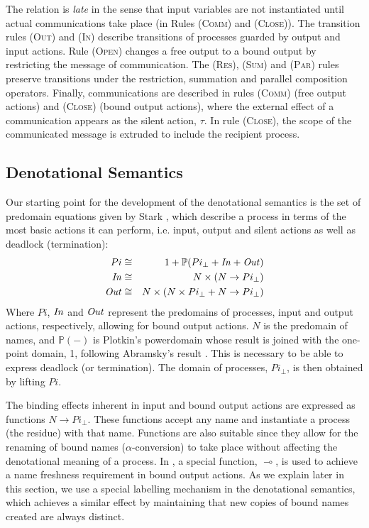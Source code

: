 \documentclass[10pt,a4paper,final,oneside,fleqn]{book}
\begin{document}
The relation is {\itshape late\/} in the sense that input variables are not instantiated until actual communications take place (in Rules (\textsc{Comm}) and (\textsc{Close})).  The transition rules (\textsc{Out}) and (\textsc{In}) describe transitions of processes guarded by output and input actions.  Rule (\textsc{Open}) changes a free output to a bound output by restricting the message of communication.  The (\textsc{Res}), (\textsc{Sum}) and (\textsc{Par}) rules preserve transitions under the restriction, summation and parallel composition operators.  Finally, communications are described in rules (\textsc{Comm}) (free output actions) and (\textsc{Close}) (bound output actions), where the external effect of a communication appears as the silent action, $\tau$. In rule (\textsc{Close}), the scope of the communicated message is extruded to include the recipient process.
\subsection{Denotational Semantics\label{sect:denpi}}
Our starting point for the development of the denotational semantics is the set of predomain equations given by Stark \cite{stark1}, which describe a process in terms of the most basic actions it can perform, i.e. input, output and silent actions as well as deadlock (termination):
\begin{eqnarray}
Pi&\cong&1+\mathbb{P}(Pi_\bot+\mbox{{\itshape In\/}}+\mbox{{\itshape Out\/}})\label{pre1}\\
\mbox{{\itshape In\/}}&\cong&N\times(N\to Pi_\bot)\label{pre2}\\
\mbox{{\itshape Out\/}}&\cong&N\times(N\times Pi_\bot+N\to Pi_\bot) \label{pre3}
\end{eqnarray}
Where $Pi$, $\mbox{{\itshape In\/}}$ and $\mbox{{\itshape Out\/}}$ represent the predomains of processes, input and output actions, respectively, allowing for bound output actions.  $N$ is the predomain of names, and $\mathbb{P}(-)$ is Plotkin's powerdomain whose result is joined with the one-point domain, 1, following Abramsky's result \cite[Def. 3.4]{abramsky1}. This is necessary to be able to express deadlock (or termination).  The domain of processes, $Pi_\bot$, is then obtained by lifting $Pi$.

The binding effects inherent in input and bound output actions are expressed as functions $N\to Pi_\bot$.  These functions accept any name and instantiate a process (the residue) with that name. Functions are also suitable since they allow for the renaming of bound names ($\alpha$-conversion) to take place without affecting the denotational meaning of a process. In \cite{stark1}, a special function, $\multimap$, is used to achieve a name freshness requirement in bound output actions. As we explain later in this section, we use a special labelling mechanism in the denotational semantics, which achieves a similar effect by maintaining that new copies of bound names created are always distinct.
\end{document}
